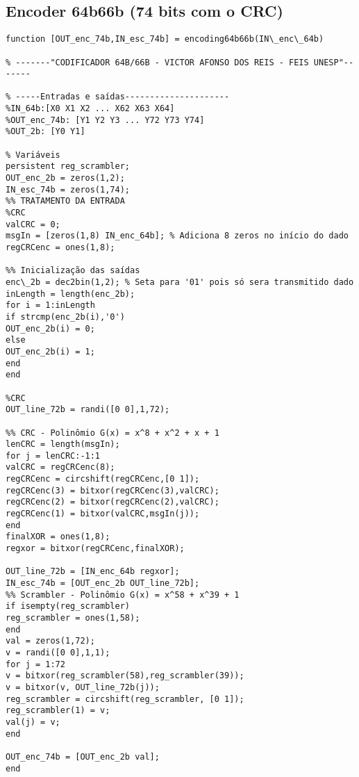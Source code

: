 
\begin{apendicesenv}
\partapendices
\chapter{Encoder 64b66b (74 bits com o CRC)}
\begin{lstlisting}
function [OUT_enc_74b,IN_esc_74b] = encoding64b66b(IN\_enc\_64b)

% -------"CODIFICADOR 64B/66B - VICTOR AFONSO DOS REIS - FEIS UNESP"-------

% -----Entradas e saídas---------------------
%IN_64b:[X0 X1 X2 ... X62 X63 X64]
%OUT_enc_74b: [Y1 Y2 Y3 ... Y72 Y73 Y74]
%OUT_2b: [Y0 Y1]

% Variáveis
persistent reg_scrambler;
OUT_enc_2b = zeros(1,2);
IN_esc_74b = zeros(1,74);
%% TRATAMENTO DA ENTRADA
%CRC
valCRC = 0;
msgIn = [zeros(1,8) IN_enc_64b]; % Adiciona 8 zeros no início do dado
regCRCenc = ones(1,8);

%% Inicialização das saídas
enc\_2b = dec2bin(1,2); % Seta para '01' pois só sera transmitido dado
inLength = length(enc_2b);
for i = 1:inLength
if strcmp(enc_2b(i),'0')
OUT_enc_2b(i) = 0;
else
OUT_enc_2b(i) = 1;
end
end

%CRC
OUT_line_72b = randi([0 0],1,72);

%% CRC - Polinômio G(x) = x^8 + x^2 + x + 1
lenCRC = length(msgIn);
for j = lenCRC:-1:1
valCRC = regCRCenc(8);
regCRCenc = circshift(regCRCenc,[0 1]);
regCRCenc(3) = bitxor(regCRCenc(3),valCRC);
regCRCenc(2) = bitxor(regCRCenc(2),valCRC);
regCRCenc(1) = bitxor(valCRC,msgIn(j));
end
finalXOR = ones(1,8);
regxor = bitxor(regCRCenc,finalXOR);

OUT_line_72b = [IN_enc_64b regxor];
IN_esc_74b = [OUT_enc_2b OUT_line_72b];
%% Scrambler - Polinômio G(x) = x^58 + x^39 + 1
if isempty(reg_scrambler)
reg_scrambler = ones(1,58);
end
val = zeros(1,72);
v = randi([0 0],1,1);
for j = 1:72
v = bitxor(reg_scrambler(58),reg_scrambler(39));
v = bitxor(v, OUT_line_72b(j));
reg_scrambler = circshift(reg_scrambler, [0 1]);
reg_scrambler(1) = v;
val(j) = v;
end

OUT_enc_74b = [OUT_enc_2b val];
end
\end{lstlisting}
    



\end{apendicesenv}
